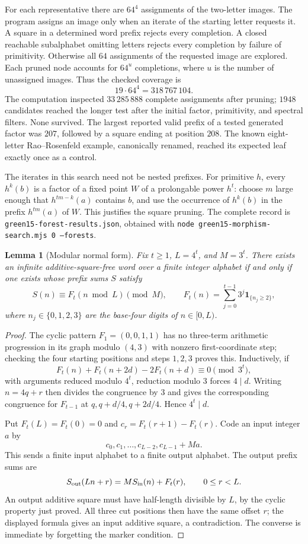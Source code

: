 \documentclass[11pt]{article}
\newtheorem{lemma}{Lemma}
\begin{document}
For each representative there are $64^4$ assignments of the two-letter
images. The program assigns an image only when an iterate of the starting
letter requests it. A square in a determined word prefix rejects every
completion. A closed reachable subalphabet omitting letters rejects every
completion by failure of primitivity. Otherwise all $64$ assignments of the
requested image are explored. Each pruned node accounts for $64^u$ completions,
where $u$ is the number of unassigned images. Thus the checked coverage is
\[
 19\cdot64^4=318\,767\,104.
\]
The computation inspected $33\,285\,888$ complete assignments after pruning;
$1948$ candidates reached the longer test after the initial factor, primitivity,
and spectral filters. None survived. The largest reported valid prefix of a
tested generated factor was $207$, followed by a square ending at position $208$.
The known eight-letter Rao--Rosenfeld example, canonically renamed, reached its
expected leaf exactly once as a control.

The iterates in this search need not be nested prefixes. For primitive $h$,
every $h^k(b)$ is a factor of a fixed point $W$ of a prolongable power $h^t$:
choose $m$ large enough that $h^{tm-k}(a)$ contains $b$, and use the occurrence
of $h^k(b)$ in the prefix $h^{tm}(a)$ of $W$. This justifies the square pruning.
The complete record is \texttt{green15-forest-results.json}, obtained with
\texttt{node green15-morphism-search.mjs 0 --forests}.

\begin{lemma}[Modular normal form]
Fix $t\ge1$, $L=4^t$, and $M=3^t$. There exists an infinite additive-square-free
word over a finite integer alphabet if and only if one exists whose prefix sums
$S$ satisfy
\[
 S(n)\equiv F_t(n\bmod L)\pmod M,
 \qquad
 F_t(n)=\sum_{j=0}^{t-1}3^j\mathbf1_{\{n_j\ge2\}},
\]
where $n_j\in\{0,1,2,3\}$ are the base-four digits of $n\in[0,L)$.
\end{lemma}
\begin{proof}
The cyclic pattern $F_1=(0,0,1,1)$ has no three-term arithmetic progression
in its graph modulo $(4,3)$ with nonzero first-coordinate step; checking the
four starting positions and steps $1,2,3$ proves this. Inductively, if
\[
 F_t(n)+F_t(n+2d)-2F_t(n+d)\equiv0\pmod {3^t},
\]
with arguments reduced modulo $4^t$, reduction modulo $3$ forces $4\mid d$.
Writing $n=4q+r$ then divides the congruence by $3$ and gives the corresponding
congruence for $F_{t-1}$ at $q,q+d/4,q+2d/4$. Hence $4^t\mid d$.

Put $F_t(L)=F_t(0)=0$ and $c_r=F_t(r+1)-F_t(r)$. Code an input integer $a$ by
\[
 c_0,c_1,\ldots,c_{L-2},c_{L-1}+Ma.
\]
This sends a finite input alphabet to a finite output alphabet. The output
prefix sums are
\[
 S_{\rm out}(Ln+r)=M S_{\rm in}(n)+F_t(r),\qquad 0\le r<L.
\]
An output additive square must have half-length divisible by $L$, by the
cyclic property just proved. All three cut positions then have the same
offset $r$; the displayed formula gives an input additive square, a
contradiction. The converse is immediate by forgetting the marker condition.
\end{proof}
\end{document}
